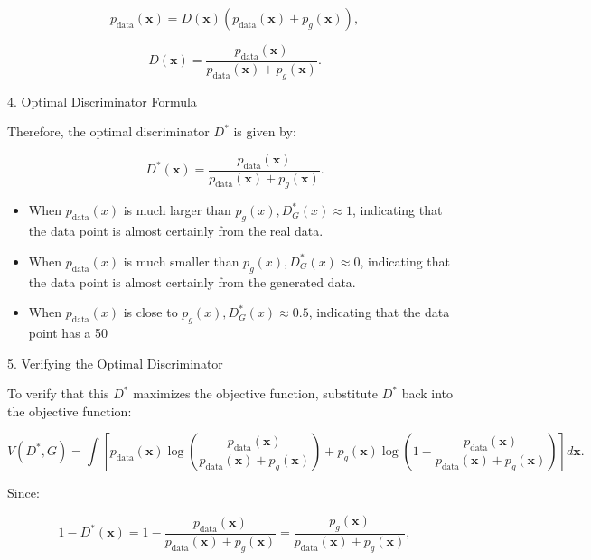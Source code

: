 \begin{equation}
    p_{\text{data}}(\mathbf{x}) = D(\mathbf{x})(p_{\text{data}}(\mathbf{x}) + p_g(\mathbf{x})),
\end{equation}

\begin{equation}
    D(\mathbf{x}) = \frac{p_{\text{data}}(\mathbf{x})}{p_{\text{data}}(\mathbf{x}) + p_g(\mathbf{x})}.
\end{equation}

4. Optimal Discriminator Formula

Therefore, the optimal discriminator \( D^* \) is given by:

\begin{equation}
    D^*(\mathbf{x}) = \frac{p_{\text{data}}(\mathbf{x})}{p_{\text{data}}(\mathbf{x}) + p_g(\mathbf{x})}.
\end{equation}


\begin{itemize}
    \item When $p_{\text{data}}(x)$ is much larger than $p_g(x), D^*_G(x) \approx 1$, indicating that the data point is almost certainly from the real data.
    \item When $p_{\text{data}}(x)$ is much smaller than $p_g(x), D^*_G(x) \approx 0$, indicating that the data point is almost certainly from the generated data.
    \item When $p_{\text{data}}(x)$ is close to $p_g(x), D^*_G(x) \approx 0.5$, indicating that the data point has a 50%
\end{itemize}


5. Verifying the Optimal Discriminator

To verify that this \( D^* \) maximizes the objective function, substitute \( D^* \) back into the objective function:

\begin{equation}
    V(D^*, G) = \int \left[ p_{\text{data}}(\mathbf{x}) \log \left( \frac{p_{\text{data}}(\mathbf{x})}{p_{\text{data}}(\mathbf{x}) + p_g(\mathbf{x})} \right) + p_g(\mathbf{x}) \log \left( 1 - \frac{p_{\text{data}}(\mathbf{x})}{p_{\text{data}}(\mathbf{x}) + p_g(\mathbf{x})} \right) \right] d\mathbf{x}.
\end{equation}

Since:

\begin{equation}
    1 - D^*(\mathbf{x}) = 1 - \frac{p_{\text{data}}(\mathbf{x})}{p_{\text{data}}(\mathbf{x}) + p_g(\mathbf{x})} = \frac{p_g(\mathbf{x})}{p_{\text{data}}(\mathbf{x}) + p_g(\mathbf{x})},
\end{equation}

